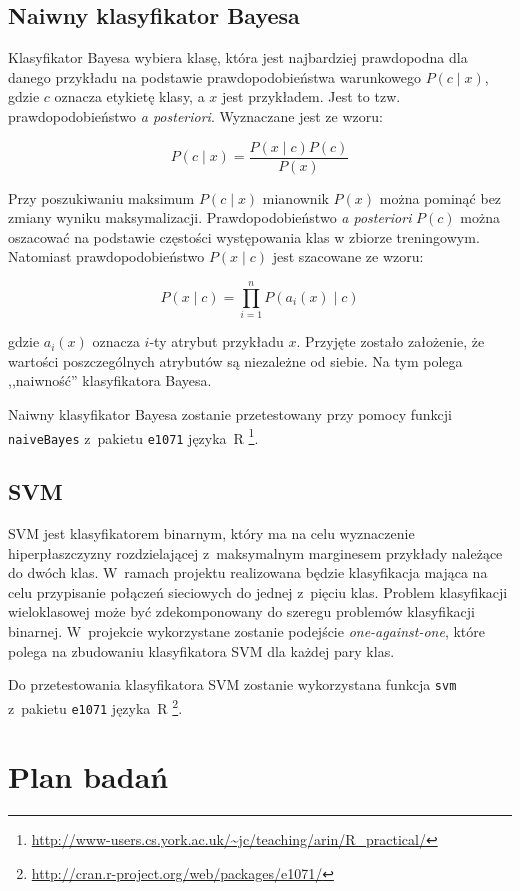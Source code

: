 \documentclass[a4paper, 12pt]{article}
\begin{document}
\subsection{Naiwny klasyfikator Bayesa}

Klasyfikator Bayesa wybiera klasę, która jest najbardziej prawdopodna dla danego przykładu na 
podstawie prawdopodobieństwa
warunkowego $P(c \mid x)$, gdzie $c$ oznacza etykietę klasy, a $x$ jest przykładem. 
Jest to tzw. prawdopodobieństwo
\textit{a posteriori}. Wyznaczane jest ze wzoru:

$$ P(c \mid x) = \frac{P(x \mid c)P(c)}{P(x)} $$

Przy poszukiwaniu maksimum $P(c \mid x)$ mianownik $P(x)$ można pominąć bez zmiany wyniku 
maksymalizacji.
Prawdopodobieństwo \textit{a posteriori} $P(c)$ można oszacować na podstawie częstości 
występowania klas w zbiorze treningowym.
Natomiast prawdopodobieństwo $P(x \mid c)$ jest szacowane ze wzoru:

$$ P(x \mid c) = \prod_{i=1}^n P(a_i(x) \mid c)$$

gdzie $a_i(x)$ oznacza $i$-ty atrybut przykładu $x$.
Przyjęte zostało założenie, że wartości poszczególnych atrybutów są niezależne od siebie.
Na tym polega ,,naiwność'' klasyfikatora Bayesa.

Naiwny klasyfikator Bayesa zostanie przetestowany przy pomocy funkcji \texttt{naiveBayes} z~pakietu \texttt{e1071} języka~R
\footnote{\url{http://www-users.cs.york.ac.uk/~jc/teaching/arin/R_practical/}}.

\subsection{SVM}
SVM jest klasyfikatorem binarnym, który ma na celu wyznaczenie hiperpłaszczyzny rozdzielającej 
z~maksymalnym marginesem przykłady należące do dwóch klas. W~ramach projektu realizowana będzie 
klasyfikacja mająca na celu przypisanie połączeń sieciowych do jednej z~pięciu klas. 
Problem klasyfikacji wieloklasowej może być zdekomponowany do szeregu problemów klasyfikacji binarnej. 
W~projekcie wykorzystane zostanie podejście \textit{one-against-one}, 
które polega na zbudowaniu klasyfikatora SVM dla każdej pary klas. 

Do przetestowania klasyfikatora SVM zostanie wykorzystana funkcja \texttt{svm} z~pakietu 
\texttt{e1071} języka~R \footnote{\url{http://cran.r-project.org/web/packages/e1071/}}.

\section{Plan badań}
\end{document}
